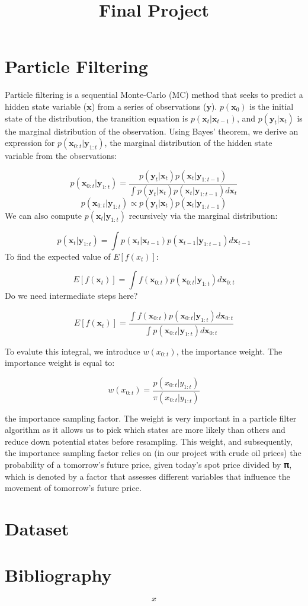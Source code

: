 \documentclass[
]{article}
\title{Final Project}
\author{}
\date{\vspace{-2.5em}}
\begin{document}
\maketitle

\hypertarget{particle-filtering}{%
\section{Particle Filtering}\label{particle-filtering}}

Particle filtering is a sequential Monte-Carlo (MC) method that seeks to
predict a hidden state variable (\(\textbf{x}\)) from a series of
observations (\(\textbf{y}\)). \(p(\textbf{x}_0)\) is the initial state
of the distribution, the transition equation is
\(p(\textbf{x}_t|\textbf{x}_{t-1})\), and
\(p(\textbf{y}_t|\textbf{x}_t)\) is the marginal distribution of the
observation. Using Bayes' theorem, we derive an expression for
\(p(\textbf{x}_{0:t}|\textbf{y}_{1:t})\), the marginal distribution of
the hidden state variable from the observations:

\[p(\textbf{x}_{0:t}|\textbf{y}_{1:t}) = \frac{p(\textbf{y}_{t}|\textbf{x}_{t})p(\textbf{x}_{t}|\textbf{y}_{1:t-1})}{\int{p(\textbf{y}_{t}|\textbf{x}_{t})p(\textbf{x}_{t}|\textbf{y}_{1:t-1})}d\textbf{x}_t}\]
\[p(\textbf{x}_{0:t}|\textbf{y}_{1:t}) \propto p(\textbf{y}_{t}|\textbf{x}_{t})p(\textbf{x}_{t}|\textbf{y}_{1:t-1})\]
We can also compute \(p(\textbf{x}_{t}|\textbf{y}_{1:t})\) recursively
via the marginal distribution:

\[p(\textbf{x}_{t}|\textbf{y}_{1:t}) = \int {p(\textbf{x}_{t}|\textbf{x}_{t-1})p(\textbf{x}_{t-1}|\textbf{y}_{1:t-1})}d \textbf{x}_{t-1}\]
To find the expected value of \(E[f(x_t)]\):

\[E[f(\textbf{x}_t)] = \int f(\textbf{x}_{0:t}) p(\textbf{x}_{0:t}|\textbf{y}_{1:t})d \textbf{x}_{0:t}\]
Do we need intermediate steps here?

\[E[f(\textbf{x}_t)] = \frac{\int f(\textbf{x}_{0:t}) p(\textbf{x}_{0:t}|\textbf{y}_{1:t})d \textbf{x}_{0:t}}{\int p(\textbf{x}_{0:t}|\textbf{y}_{1:t})d \textbf{x}_{0:t}}\]

To evalute this integral, we introduce \(w(x_{0:t})\), the importance
weight. The importance weight is equal to:

\[w(x_{0:t}) = \frac{p(x_{0:t}|y_{1:t})}{\pi(x_{0:t}|y_{1:t})}\]

the importance sampling factor. The weight is very important in a
particle filter algorithm as it allows us to pick which states are more
likely than others and reduce down potential states before resampling.
This weight, and subsequently, the importance sampling factor relies on
(in our project with crude oil prices) the probability of a tomorrow's
future price, given today's spot price divided by 𝛑, which is denoted by
a factor that assesses different variables that influence the movement
of tomorrow's future price.

\hypertarget{dataset}{%
\section{Dataset}\label{dataset}}

\hypertarget{bibliography}{%
\section{Bibliography}\label{bibliography}}

\[x\]
\end{document}
